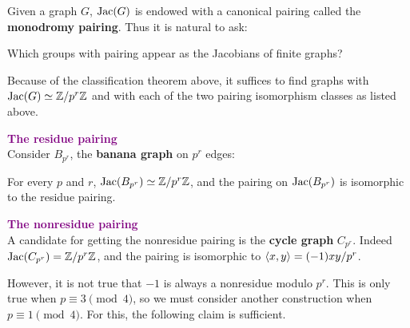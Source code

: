 \documentclass[landscape,final,columns=3]{baposter}
\begin{document}
\begin{poster}
{\begin{multicols}{2}
Given a graph $G$, $\operatorname{Jac}(G)$ is endowed with a canonical pairing called the \textbf{monodromy pairing}. Thus it is natural to ask:

\begin{quest*}
Which groups with pairing appear as the Jacobians of finite graphs?
\end{quest*}

Because of the classification theorem above, it suffices to find graphs with $\operatorname{Jac}(G)\simeq \mathbb{Z}/p^r\mathbb{Z}$ and with each of the two pairing isomorphism classes as listed above.

\vspace{0.1in}
{\textcolor{purple}{\large{\bf{The residue pairing}}}} \vspace{0.05in}\\
Consider $B_{p^r}$, the \textbf{banana graph} on $p^r$ edges:

\begin{center}
\end{center}

For every $p$ and $r$, $\operatorname{Jac}(B_{p^r})\simeq\mathbb{Z}/p^r\mathbb{Z}$, and the pairing on $\operatorname{Jac}(B_{p^r})$ is isomorphic to the residue pairing.

\vspace{0.1in}
{\textcolor{purple}{\large{\bf{The nonresidue pairing}}}} \vspace{0.05in}\\
A candidate for getting the nonresidue pairing is the \textbf{cycle graph} $C_{p^r}$. Indeed $\operatorname{Jac}(C_{p^r})=\mathbb{Z}/p^r\mathbb{Z}$, and the pairing is isomorphic to $\langle x, y \rangle=(-1)xy/p^r$.

However, it is not true that $-1$ is always a nonresidue modulo $p^r$. This is only true when $p\equiv 3\pmod 4$, so we must consider another construction when $p\equiv 1\pmod 4$. For this, the following claim is sufficient. 


\end{multicols}}
\end{poster}
\end{document}
